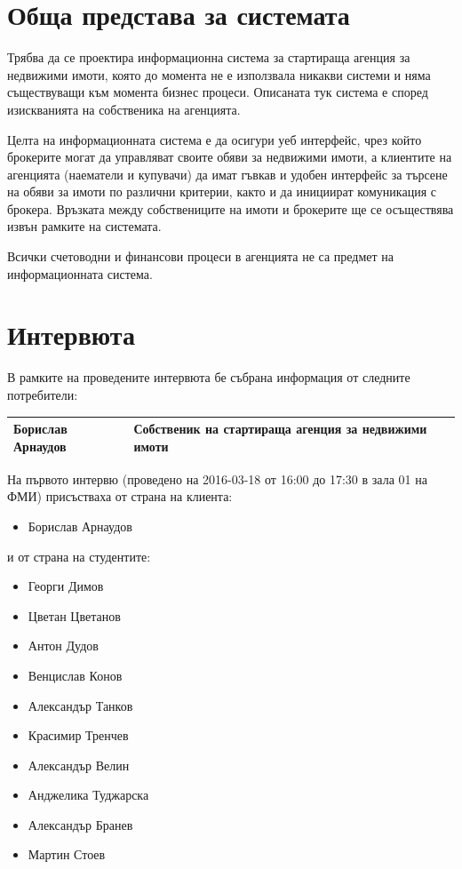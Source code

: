 \documentclass[a4paper]{article}
\begin{document}
\section{Обща представа за системата} %
        
Трябва да се проектира информационна система за стартираща агенция за недвижими имоти, която до момента не е използвала никакви системи и няма съществуващи към момента бизнес процеси. Описаната тук система е според изискванията на собственика на агенцията.

Целта на информационната система е да осигури уеб интерфейс, чрез който брокерите могат да управляват своите обяви за недвижими имоти, а клиентите на агенцията (наематели и купувачи) да имат гъвкав и удобен интерфейс за търсене на обяви за имоти по различни критерии, както и да инициират комуникация с брокера. Връзката между собствениците на имоти и брокерите ще се осъществява извън рамките на системата.

Всички счетоводни и финансови процеси в агенцията не са предмет на информационната система.

\section{Интервюта}
В рамките на проведените интервюта бе събрана информация от следните потребители:

\begin{center}
\begin{tabular}{|l|l|}
\hline
Борислав Арнаудов & Собственик на стартираща агенция за недвижими имоти \\
\hline
\end{tabular}
\end{center}

На първото интервю (проведено на 2016-03-18 от 16:00 до 17:30 в зала 01 на ФМИ) присъстваха от страна на клиента:
\begin{itemize}
\item Борислав Арнаудов
\end{itemize}
и от страна на студентите:
\begin{itemize}
\item Георги Димов
\item Цветан Цветанов
\item Антон Дудов
\item Венцислав Конов
\item Александър Танков
\item Красимир Тренчев
\item Александър Велин
\item Анджелика Туджарска
\item Александър Бранев
\item Мартин Стоев
\end{itemize}
\end{document}
